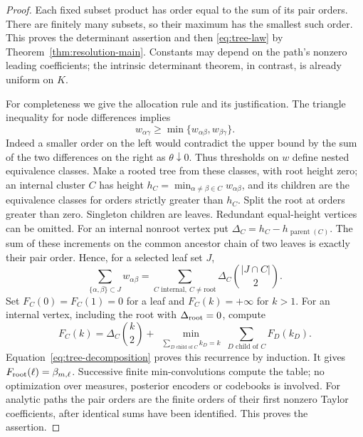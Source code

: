 \documentclass[11pt]{amsart}
\theoremstyle{definition}\newtheorem{definition}[theorem]{Definition}
\theoremstyle{remark}\newtheorem{remark}[theorem]{Remark}
\begin{document}
\begin{proof}
Each fixed subset product has order equal to the sum of its pair orders.
There are finitely many subsets, so their maximum has the smallest such
order. This proves the determinant assertion and then
\eqref{eq:tree-law} by Theorem~\ref{thm:resolution-main}.
Constants may depend on the path's
nonzero leading coefficients; the intrinsic determinant theorem, in
contrast, is already uniform on $K$.

For completeness we give the allocation rule and its justification. The
triangle inequality for node differences implies
\[
 w_{\alpha\gamma}\ge
       \min\{w_{\alpha\beta},w_{\beta\gamma}\}.
\]
Indeed a smaller order on the left would contradict the upper bound by
the sum of the two differences on the right as $\theta\downarrow0$.
Thus thresholds on $w$ define nested equivalence classes. Make a rooted
tree from these classes, with root height zero; an internal cluster $C$
has height $h_C=\min_{\alpha\ne\beta\in C}w_{\alpha\beta}$,
and its children are the equivalence classes for orders strictly greater
than $h_C$. Split the root at orders greater than zero. Singleton
children are leaves. Redundant equal-height vertices can be omitted.
For an internal nonroot vertex put
$\Delta_C=h_C-h_{\operatorname{parent}(C)}$. The sum of these increments
on the common ancestor chain of two leaves is exactly their pair order.
Hence, for a selected leaf set $J$,
\begin{equation}\label{eq:tree-decomposition}
 \sum_{\{\alpha,\beta\}\subset J}w_{\alpha\beta}
   =\sum_{C\text{ internal},\ C\ne\mathrm{root}}
               \Delta_C\binom{|J\cap C|}{2}.
\end{equation}
Set $F_C(0)=F_C(1)=0$ for a leaf and $F_C(k)=+\infty$ for $k>1$.
For an internal vertex, including the root with $\Delta_{\rm root}=0$,
compute
\begin{equation}\label{eq:tree-dp}
 F_C(k)=\Delta_C\binom{k}{2}+
   \min_{\substack{\sum_{D\text{ child of }C}k_D=k}}
                 \sum_{D\text{ child of }C}F_D(k_D).
\end{equation}
Equation~\eqref{eq:tree-decomposition} proves this recurrence by induction.
It gives $F_{\rm root}(\ell)=\beta_{m,\ell}$. Successive finite
min-convolutions compute the table; no optimization over measures,
posterior encoders or codebooks is involved. For analytic paths the pair
orders are the finite orders of their first nonzero Taylor coefficients,
after identical sums have been identified. This proves the assertion.
\end{proof}
\end{document}
